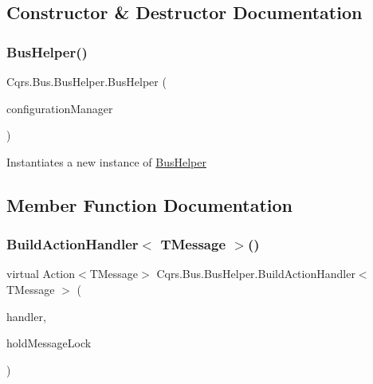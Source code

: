 \subsection{Constructor \& Destructor Documentation}
\mbox{\label{classCqrs_1_1Bus_1_1BusHelper_a7799db8bc78bdd9ec25be5bd301d0b8a_a7799db8bc78bdd9ec25be5bd301d0b8a}} 
\subsubsection{\texorpdfstring{Bus\+Helper()}{BusHelper()}}
{\footnotesize\ttfamily Cqrs.\+Bus.\+Bus\+Helper.\+Bus\+Helper (\begin{DoxyParamCaption}\item[{\hyperlink{interfaceCqrs_1_1Configuration_1_1IConfigurationManager}{I\+Configuration\+Manager}}]{configuration\+Manager }\end{DoxyParamCaption})}



Instantiates a new instance of \hyperlink{classCqrs_1_1Bus_1_1BusHelper}{Bus\+Helper} 



\subsection{Member Function Documentation}
\mbox{\label{classCqrs_1_1Bus_1_1BusHelper_a6dc1f5166b7bcd13aa7a0d5e25ded295_a6dc1f5166b7bcd13aa7a0d5e25ded295}} 
\subsubsection{\texorpdfstring{Build\+Action\+Handler$<$ T\+Message $>$()}{BuildActionHandler< TMessage >()}}
{\footnotesize\ttfamily virtual Action$<$T\+Message$>$ Cqrs.\+Bus.\+Bus\+Helper.\+Build\+Action\+Handler$<$ T\+Message $>$ (\begin{DoxyParamCaption}\item[{Action$<$ T\+Message $>$}]{handler,  }\item[{bool}]{hold\+Message\+Lock }\end{DoxyParamCaption})\hspace{0.3cm}{\ttfamily [virtual]}}



